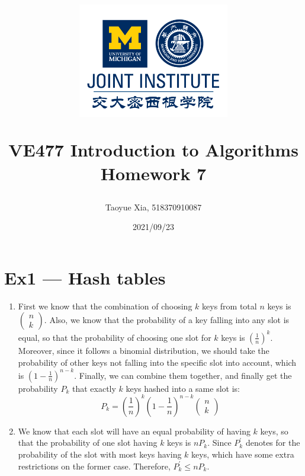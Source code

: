 \documentclass[12pt, a4paper]{article}
\title{
    \begin{figure}[H]
        \centering
        \includegraphics[width=7cm, height=5cm]{AAA.png}
    \end{figure}
    VE477 Introduction to Algorithms\\ 
    Homework 7}
\author{Taoyue Xia, 518370910087}
\date{2021/09/23}
\begin{document}
\maketitle

\newpage
\section*{Ex1 --- Hash tables}
\begin{enumerate}
    \item First we know that the combination of choosing $k$ keys from total $n$ keys is $\begin{pmatrix}
        n \\ k
    \end{pmatrix}$. Also, we know that the probability of a key falling into any slot is equal, 
    so that the probability of choosing one slot for $k$ keys is $(\frac{1}{n})^k$. Moreover, 
    since it follows a binomial distribution, 
    we should take the probability of other keys not falling into the specific slot into account, 
    which is $(1 - \frac{1}{n})^{n - k}$. Finally, we can combine them together, 
    and finally get the probability $P_k$ that exactly $k$ keys hashed into a same slot is:
    $$P_k = (\frac{1}{n})^k (1 - \frac{1}{n})^{n - k} \begin{pmatrix} n\\ k \end{pmatrix}$$

    \item We know that each slot will have an equal probability of having $k$ keys, 
          so that the probability of one slot having $k$ keys is $nP_k$. 
          Since $P_k^\prime$ denotes for the probability of the slot with most keys having $k$ keys, 
          which have some extra restrictions on the former case. 
          Therefore, $P_k^\prime \leq nP_k$.
    

\end{enumerate}
\end{document}
